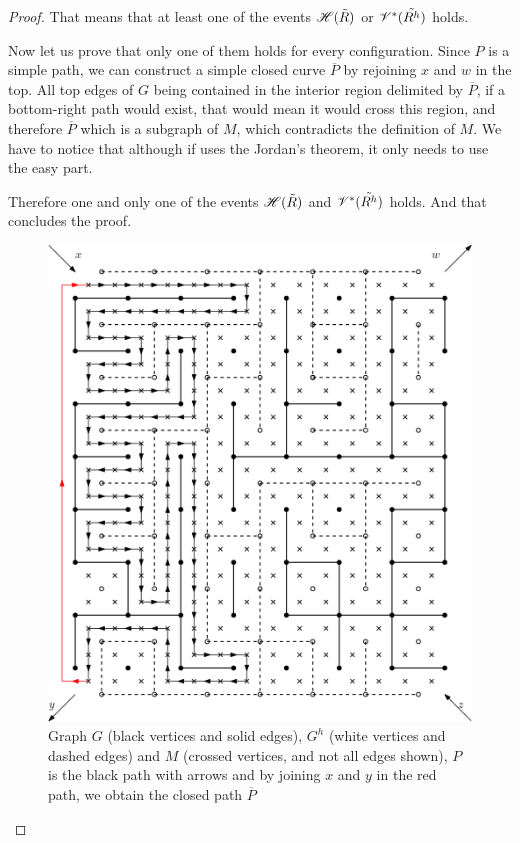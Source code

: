 \documentclass[a4paper,11pt]{article}
\theoremstyle{plain}
\theoremstyle{definition}
\theoremstyle{remark}
\begin{document}
\begin{proof}
That means that at least one of the events $\mathscr{H}(\Tilde{R})$ or $\mathscr{V^*}(\Tilde{R^h})$ holds.

Now let us prove that only one of them holds for every configuration. Since $P$ is a simple path, we can construct a simple closed curve $\overline{P}$ by rejoining $x$ and $w$ in the top. All top edges of $G$ being contained in the interior region delimited by $\overline{P}$, if a bottom-right path would exist, that would mean it would cross this region, and therefore $\overline{P}$ which is a subgraph of $M$, which contradicts the definition of $M$. We have to notice that although if uses the Jordan's theorem, it only needs to use the easy part.

Therefore one and only one of the events $\mathscr{H}(\Tilde{R})$ and $\mathscr{V^*}(\Tilde{R^h})$ holds. And that concludes the proof.
\begin{figure}
    \centering
    \includegraphics{graph_kesten}
    \caption{Graph $G$ (black vertices and solid edges), $G^h$ (white vertices and dashed edges) and $M$ (crossed vertices, and not all edges shown), $P$ is the black path with arrows and by joining $x$ and $y$ in the red path, we obtain the closed path $\overline{P}$}
    \label{fig:lr_thm}
\end{figure}
\end{proof}
\end{document}
